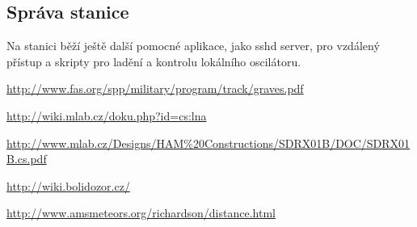 \documentclass[12pt,a4paper,oneside]{article}
\begin{document}
\subsection{Správa stanice}

Na stanici běží ještě další pomocné aplikace, jako sshd server, pro vzdálený přístup a skripty pro ladění a kontrolu lokálního oscilátoru.


\begin{thebibliography}{99}
\href{http://www.fas.org/spp/military/program/track/graves.pdf}{http://www.fas.org/spp/military/program/track/graves.pdf}

\href{http://wiki.mlab.cz/doku.php?id=cs:lna}{http://wiki.mlab.cz/doku.php?id=cs:lna}

\href{http://www.mlab.cz/Designs/HAM\%20Constructions/SDRX01B/DOC/SDRX01B.cs.pdf}{http://www.mlab.cz/Designs/HAM\%20Constructions/SDRX01B/DOC/SDRX01B.cs.pdf}

\href{http://wiki.bolidozor.cz/}{http://wiki.bolidozor.cz/}

\href{http://www.amsmeteors.org/richardson/distance.html}{http://www.amsmeteors.org/richardson/distance.html}


\end{thebibliography}
\end{document}
